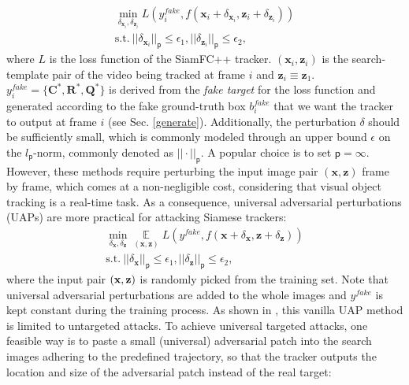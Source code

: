 \documentclass[journal]{IEEEtran}
\renewcommand{\uline}{}
\begin{document}
\begin{equation}
\begin{gathered}
  \min\limits_{\delta_{\textbf{x}_{i}}, \delta_{\textbf{z}_{i}}} L(y^{fake}_i, f(\textbf{x}_i + \delta_{\textbf{x}_{i}}, \textbf{z}_i + \delta_{\textbf{z}_{i}}))\\
  \text{s.t.}\ ||\delta_{\textbf{x}_i}||_{\mathsf{p}} \le \epsilon_1, ||\delta_{\textbf{z}_i}||_{\mathsf{p}} \le \epsilon_2,
\end{gathered}
\end{equation}
where $L$ is the loss function of the SiamFC++ tracker. $(\textbf{x}_i, \textbf{z}_i)$ is the search-template pair of the video being tracked at frame $i$ and $\textbf{z}_i \equiv \textbf{z}_1$. $y^{fake}_i=\{\textbf{C}^*, \textbf{R}^*, \textbf{Q}^*\}$ is derived from the \textit{fake target} for the loss function and generated according to the fake \uline{ground-truth} box $b^{fake}_i$ that we want the tracker to output at frame $i$ (see Sec. \ref{generate}). Additionally, the perturbation $\delta$ should be sufficiently small, which is commonly modeled through an upper bound $\epsilon$ on the $l_{\mathsf{p}}\text{-norm}$, commonly denoted as $||\cdot||_{\mathsf{p}}$. A popular choice is to set ${\mathsf{p}}=\infty$. However, these methods require perturbing the input image pair $(\textbf{x}, \textbf{z})$ frame by frame, which comes at a non-negligible cost, considering that visual object tracking is a real-time task. As a consequence, universal adversarial perturbations (UAPs) \cite{UAP, shafahi2020universal} are more practical for attacking Siamese trackers:
\begin{equation}
  \begin{gathered}
    \min\limits_{\delta_\textbf{x}, \delta_\textbf{z}} \mathop{\mathbb{E}}\limits_{(\textbf{x}, \textbf{z})} L(y^{fake}, f(\textbf{x} + \delta_\textbf{x}, \textbf{z} + \delta_\textbf{z}))\\
    \text{s.t.}\ ||\delta_\textbf{x}||_{\mathsf{p}} \le \epsilon_1, ||\delta_\textbf{z}||_{\mathsf{p}} \le \epsilon_2,
  \end{gathered}
  \label{eq:UAP}
\end{equation}  
where the input pair $(\textbf x,\textbf z)$ is randomly picked from the training set. Note that universal adversarial perturbations are added to the whole \uline{images} and $y^{fake}$ is kept constant during the training process. As shown in \cite{hirano2020simple}, this vanilla UAP method is limited to untargeted attacks. To achieve universal targeted attacks, one feasible way is to paste a small (universal) adversarial patch into the search images adhering to the predefined trajectory, so that the tracker outputs the location and size of the adversarial patch instead of the real target:
\end{document}
